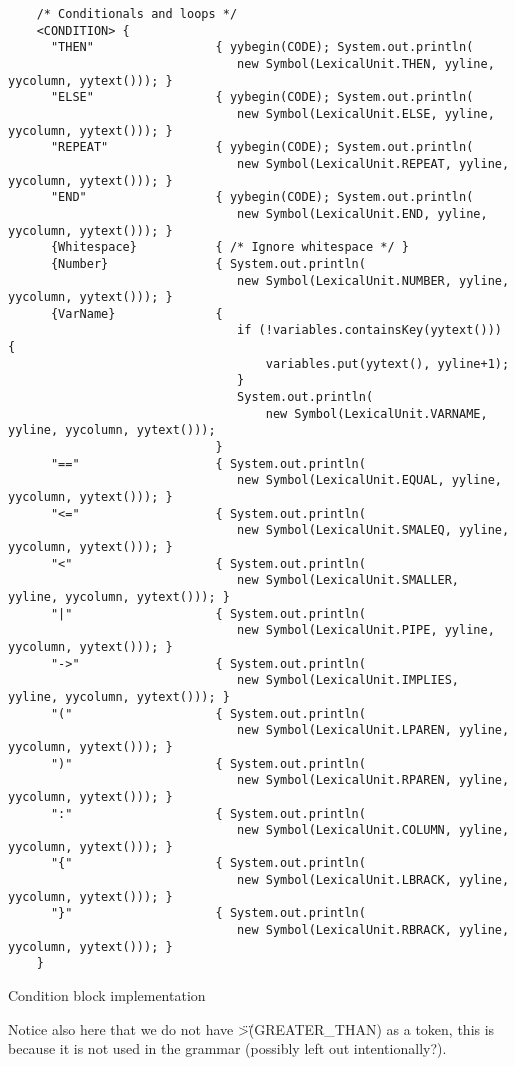 	\begin{verbatim}
	/* Conditionals and loops */
	<CONDITION> {
	  "THEN"                 { yybegin(CODE); System.out.println(
								new Symbol(LexicalUnit.THEN, yyline, yycolumn, yytext())); }
	  "ELSE"                 { yybegin(CODE); System.out.println(
								new Symbol(LexicalUnit.ELSE, yyline, yycolumn, yytext())); }
	  "REPEAT"               { yybegin(CODE); System.out.println(
								new Symbol(LexicalUnit.REPEAT, yyline, yycolumn, yytext())); }
	  "END"                  { yybegin(CODE); System.out.println(
								new Symbol(LexicalUnit.END, yyline, yycolumn, yytext())); }
	  {Whitespace}           { /* Ignore whitespace */ }
	  {Number}               { System.out.println(
								new Symbol(LexicalUnit.NUMBER, yyline, yycolumn, yytext())); }
	  {VarName}              {
								if (!variables.containsKey(yytext())) {
									variables.put(yytext(), yyline+1);
								}
								System.out.println(
									new Symbol(LexicalUnit.VARNAME, yyline, yycolumn, yytext()));
							 }
	  "=="                   { System.out.println(
								new Symbol(LexicalUnit.EQUAL, yyline, yycolumn, yytext())); }
	  "<="                   { System.out.println(
								new Symbol(LexicalUnit.SMALEQ, yyline, yycolumn, yytext())); }
	  "<"                    { System.out.println(
								new Symbol(LexicalUnit.SMALLER, yyline, yycolumn, yytext())); }
	  "|"                    { System.out.println(
								new Symbol(LexicalUnit.PIPE, yyline, yycolumn, yytext())); }
	  "->"                   { System.out.println(
								new Symbol(LexicalUnit.IMPLIES, yyline, yycolumn, yytext())); }
	  "("                    { System.out.println(
								new Symbol(LexicalUnit.LPAREN, yyline, yycolumn, yytext())); }
	  ")"                    { System.out.println(
								new Symbol(LexicalUnit.RPAREN, yyline, yycolumn, yytext())); }
	  ":"                    { System.out.println(
								new Symbol(LexicalUnit.COLUMN, yyline, yycolumn, yytext())); }
	  "{"                    { System.out.println(
								new Symbol(LexicalUnit.LBRACK, yyline, yycolumn, yytext())); }
	  "}"                    { System.out.println(
								new Symbol(LexicalUnit.RBRACK, yyline, yycolumn, yytext())); }
	}
	\end{verbatim}

    \begin{table}[h]
		\centering
		\caption{Condition block implementation}
	\end{table}
 
	Notice also here that we do not have \">\" (GREATER\_THAN) as a token, this is because it is not used in the grammar (possibly left out intentionally?).\\

